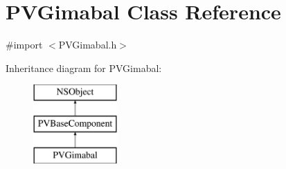\hypertarget{interface_p_v_gimabal}{}\section{P\+V\+Gimabal Class Reference}
\label{interface_p_v_gimabal}


{\ttfamily \#import $<$P\+V\+Gimabal.\+h$>$}

Inheritance diagram for P\+V\+Gimabal\+:\begin{figure}[H]
\begin{center}
\leavevmode
\includegraphics[height=3.000000cm]{interface_p_v_gimabal}
\end{center}
\end{figure}
